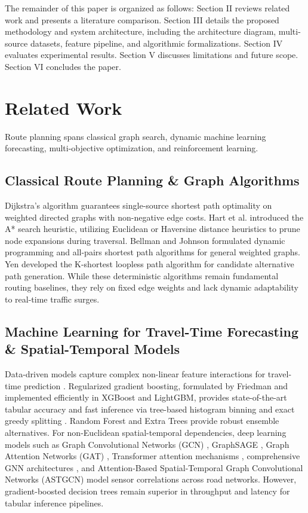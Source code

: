 \documentclass[journal]{IEEEtran}
\begin{document}
The remainder of this paper is organized as follows: Section II reviews related work and presents a literature comparison. Section III details the proposed methodology and system architecture, including the architecture diagram, multi-source datasets, feature pipeline, and algorithmic formalizations. Section IV evaluates experimental results. Section V discusses limitations and future scope. Section VI concludes the paper.

\section{Related Work}
Route planning spans classical graph search, dynamic machine learning forecasting, multi-objective optimization, and reinforcement learning.

\subsection{Classical Route Planning \& Graph Algorithms}
Dijkstra's algorithm \cite{ref4} guarantees single-source shortest path optimality on weighted directed graphs with non-negative edge costs. Hart et al. \cite{ref5} introduced the A* search heuristic, utilizing Euclidean or Haversine distance heuristics to prune node expansions during traversal. Bellman \cite{ref15} and Johnson \cite{ref16} formulated dynamic programming and all-pairs shortest path algorithms for general weighted graphs. Yen \cite{ref17} developed the K-shortest loopless path algorithm for candidate alternative path generation. While these deterministic algorithms remain fundamental routing baselines, they rely on fixed edge weights and lack dynamic adaptability to real-time traffic surges.

\subsection{Machine Learning for Travel-Time Forecasting \& Spatial-Temporal Models}
Data-driven models capture complex non-linear feature interactions for travel-time prediction \cite{ref18}. Regularized gradient boosting, formulated by Friedman \cite{ref19} and implemented efficiently in XGBoost \cite{ref8} and LightGBM, provides state-of-the-art tabular accuracy and fast inference via tree-based histogram binning and exact greedy splitting \cite{ref20}. Random Forest \cite{ref21} and Extra Trees \cite{ref22} provide robust ensemble alternatives. For non-Euclidean spatial-temporal dependencies, deep learning models such as Graph Convolutional Networks (GCN) \cite{ref23}, GraphSAGE \cite{ref24}, Graph Attention Networks (GAT) \cite{ref25}, Transformer attention mechanisms \cite{ref26}, comprehensive GNN architectures \cite{ref27}, and Attention-Based Spatial-Temporal Graph Convolutional Networks (ASTGCN) \cite{ref28} model sensor correlations across road networks. However, gradient-boosted decision trees remain superior in throughput and latency for tabular inference pipelines.
\end{document}
